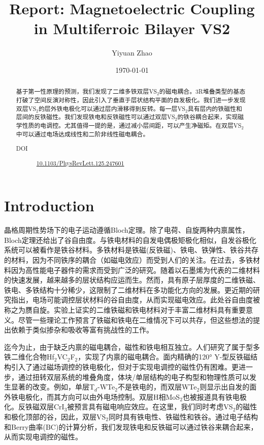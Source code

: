 \documentclass[reprint, aps, prb, showkeys]{revtex4-2}
\begin{document}
\title{Report: Magnetoelectric Coupling in Multiferroic Bilayer VS2}

\author{Yiyuan Zhao}
\date{\today}

\begin{abstract}
基于第一性原理的预测，我们发现了二维多铁双层VS$_2$的磁电耦合。3R堆叠类型的基态打破了空间反演对称性，因此引入了垂直于层状结构平面的自发极化。我们进一步发现双层VS$_2$的层外铁电极化可以通过层内滑移得到反转。每一层VS$_2$具有层内的铁磁性和层间的反铁磁性。我们发现铁电和反铁磁性可以通过双层VS$_2$的铁谷耦合起来，实现磁学性质的电调控。尤其值得一提的是，通过减小层间距，可以产生净磁矩。在双层VS$_2$中可以通过电场达成线性和二阶非线性磁电耦合。
\begin{description}
    \item[DOI] \url{10.1103/PhysRevLett.125.247601}
\end{description}
\end{abstract}


\maketitle

\section{Introduction}
晶格周期性势场下的电子运动遵循Bloch定理。除了电荷、自旋两种内禀属性，Bloch定理还给出了谷自由度。与铁电材料的自发电偶极矩极化相似，自发谷极化系统可以被看作是铁谷材料。多铁材料是铁磁(反铁磁)、铁电、铁弹性、铁谷共存的材料，因为不同铁序的耦合（如磁电效应）而受到人们的关注。在过去，多铁材料因为高性能电子器件的需求而受到广泛的研究。随着以石墨烯为代表的二维材料的快速发展，越来越多的层状结构应运而生。然而，具有原子层厚度的二维铁磁、铁电、多铁结构十分稀少，这限制了二维材料在多功能化方向的发展。更近期的研究指出，电场可能调控层状材料的谷自由度，从而实现磁电效应。此处谷自由度被称之为赝自旋。实验上证实的二维铁磁和铁电材料对于丰富二维材料具有重要意义。尽管一些理论工作预言了铁磁和铁电在二维情况下可以共存，但这些想法的提出依赖于类似掺杂和吸收等富有挑战性的工作。

迄今为止，由于缺乏内禀的磁电耦合，磁性和铁电相互独立。人们研究了属于\uppercase\expandafter{}型多铁二维化合物Hf$_2$VC$_2$F$_2$，实现了内禀的磁电耦合。面内精确的120° Y-型反铁磁结构引入了通过磁场调控的铁电极化，但对于实现电调控的磁性仍有困难。更进一步，通过扭转双层系统的堆叠角度，体块/单层结构的电子构型和物理性质可以发生显著的改变。例如，单层T$_d$-WTe$_2$不是铁电的，而双层WTe$_2$则显示出自发的面外铁电极化，而其方向可以由外电场控制。双层H相MoS$_2$也被报道具有铁电极化。反铁磁双层CrI$_3$被预言具有磁电响应效应。在这里，我们同时考虑VS$_2$的磁性和极化顶部的谷，因此，双层VS$_2$同时具有铁电性、铁磁性和铁谷。通过电子结构和Berry曲率(BC)的计算分析，我们发现铁电和反铁磁可以通过铁谷来耦合起来，从而实现电调控的磁性。
\end{document}
